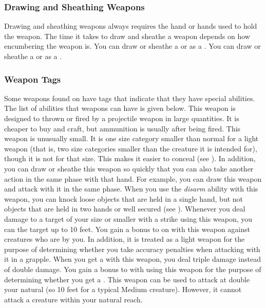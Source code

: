         \subsubsection{Drawing and Sheathing Weapons}\label{Drawing and Sheathing Weapons}
            Drawing and sheathing weapons always requires the hand or hands used to hold the weapon.
            The time it takes to draw and sheathe a weapon depends on how encumbering the weapon is.
            You can draw or sheathe a  or  as a .
            You can draw or sheathe a  or  as a .

        \subsubsection{Weapon Tags}\label{Weapon Tags}
            Some weapons found on  have tags that indicate that they have special abilities. The list of abilities that weapons can have is given below.
             This weapon is designed to thrown or fired by a projectile weapon in large quantities. It is cheaper to buy and craft, but ammunition is usually  after being fired.
             This weapon is unusually small.
            It is one size category smaller than normal for a light weapon (that is, two size categories smaller than the creature it is intended for), though it is not  for that size.
            This makes it easier to conceal (see ).
            In addition, you can draw or sheathe this weapon so quickly that you can also take another action in the same phase with that hand.
            For example, you can draw this weapon and attack with it in the same phase.
             When you use the \textit{disarm} ability with this weapon, you can knock loose objects that are held in a single hand, but not objects that are held in two hands or well secured (see ).
             Whenever you deal damage to a target of your size or smaller with a strike using this weapon, you can  the target up to 10 feet.
             You gain a  bonus to  on  with this weapon against creatures who are  by you.
            In addition, it is treated as a light weapon for the purpose of determining whether you take accuracy penalties when attacking with it in a grapple.
             When you get a  with this weapon, you deal triple damage instead of double damage.
             You gain a  bonus to  with  using this weapon for the purpose of determining whether you get a .
            \label{Long Weapon} This weapon can be used to attack at double your natural  (so 10 feet for a typical Medium creature).
            However, it cannot attack a creature within your natural reach.

